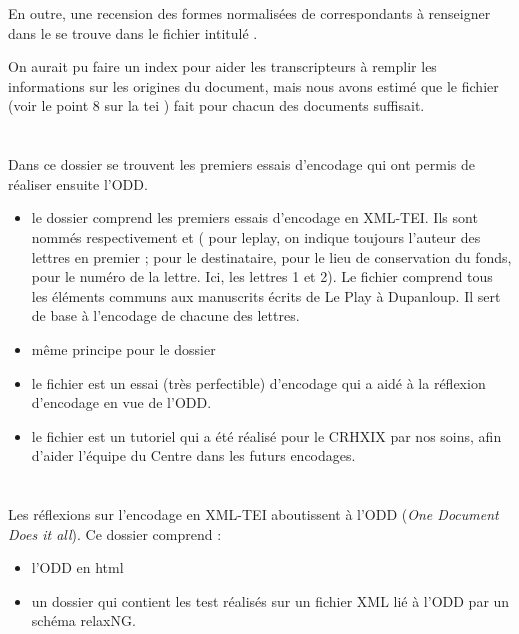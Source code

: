 En outre, une recension des formes normalisées de correspondants à renseigner dans le  se trouve dans le fichier intitulé .

On aurait pu faire un index pour aider les transcripteurs à remplir les informations sur les origines du document, mais nous avons estimé que le fichier (voir le point 8 sur la tei ) fait pour chacun des documents suffisait.

\section{}

Dans ce dossier se trouvent les premiers essais d'encodage qui ont permis de réaliser ensuite l'ODD. 
\begin{itemize}
    \item le dossier  comprend les premiers essais d'encodage en XML-TEI.
  Ils sont nommés respectivement  et  ( pour leplay, on indique toujours l'auteur des lettres en premier ;  pour le destinataire,  pour le lieu de conservation du fonds,  pour le numéro de la lettre. Ici, les lettres 1 et 2).
  Le fichier  comprend tous les éléments communs aux manuscrits écrits de Le Play à Dupanloup. Il sert de base à l'encodage de chacune des lettres.
    \item même principe pour le dossier 
    \item le fichier  est un essai (très perfectible) d'encodage qui a aidé à la réflexion d'encodage en vue de l'ODD.
    \item  le fichier  est un tutoriel qui a été réalisé pour le CRHXIX par nos soins, afin d'aider l'équipe du Centre dans les futurs encodages.
\end{itemize}



\section{}

Les réflexions sur l'encodage en XML-TEI aboutissent à l'ODD (\emph{One Document Does it all}).
Ce dossier comprend :
\begin{itemize}
    \item l'ODD en html 
    \item un dossier  qui contient les test réalisés sur un fichier XML lié à l'ODD par un schéma relaxNG. 
\end{itemize}

